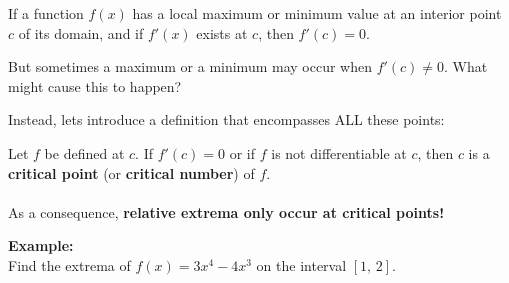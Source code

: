 \newpage


\begin{tcolorbox}[title= DEFINITION OF LOCAL EXTREME VALUES,colframe=black,sharp corners,colback=white,colbacktitle=white,coltitle=black,boxrule=1pt]

    If a function $f(x)$ has a local maximum or minimum value at an interior point $c$ of its domain, and if $f'(x)$ exists at $c$, then $f'(c)=0$. 
    
\end{tcolorbox}
\vspace{1cm}
But sometimes a maximum or a minimum may occur when $f'(c)\ne0$. What might cause this to happen?
\begin{center}
    \underline{\hspace{6cm}}
\end{center}
\vspace{2cm}

Instead, lets introduce a definition that encompasses ALL these points:\\

\begin{tcolorbox}[title= DEFINITION OF A CRITICAL POINT,colframe=black,sharp corners,colback=white,colbacktitle=white,coltitle=black,boxrule=1pt]

    Let $f$ be defined at $c$. If $f'(c)=0$ or if $f$ is not differentiable at $c$, then $c$ is a \textbf{critical point} (or \textbf{critical number}) of $f$.\\
    \\
    As a consequence, \textbf{relative extrema only occur at critical points!}
    
\end{tcolorbox}
\vspace{.15cm}
\noindent\textbf{Example:}\\
Find the extrema of $f(x)=3x^4-4x^3$ on the interval $[1,\,2]$.

\newpage

